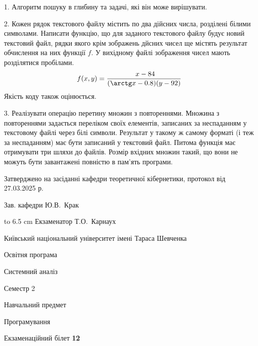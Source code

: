 \documentclass[12pt, ukrainian]{article}
\begin{document}
{%
1. Алгоритм пошуку в глибину та задачі, які він може вирішувати.%
\par
\vspace{2mm}

2. Кожен рядок текстового файлу містить по два дійсних числа, розділені білими символами.
Написати функцію, що для заданого текстового файлу будує новий текстовий файл, рядки якого крім зображень дйсних чисел ще містять результат обчислення на них функції $f$. У вихідному файлі зображення чисел мають розділятися пробілами. 
$$f(x, y) =\frac{\ x - 84}{(\arctg x - 0.8) (y - 92)}$$ 
Якість коду також оцінюється.

\par
\vspace{2mm}

3. Реалізувати операцію перетину множин з повтореннями. Множина з повтореннями задається переліком своїх елементів, записаних за неспаданням у текстовому файлі через білі символи. Результат у такому ж самому форматі (і теж за неспаданням) має бути записаний у текстовий файл. Питома функція має отримувати три шляхи до файлів. Розмір вхідних множин такий, що вони не можуть бути завантажені повністю в пам’ять програми.

}
{\smallskip\smallskip \begin {scriptsize} Затверджено на засіданні кафедри теоретичної кібернетики, протокол   від   27.03.2025 р.\par\smallskip\smallskip\smallskip\smallskip
{\parbox {6.5 cm} {Зав. кафедри \dotfill Ю.В.~Крак}}\hspace {0.7cm} {\hbox to 6.5 cm { Екзаменатор \dotfill Т.О.~Карнаух}} \end{scriptsize}}
\vspace{2.9cm}
{{\begin {scriptsize}\par
{ \center  Київський національний університет імені Тараса Шевченка \par}
{\parbox {5 cm}{Освітня програма \hfill}{\parbox {7 cm}{Системний аналіз\hfill}}\parbox {6 cm}{\hfill Семестр 2}}\par
{\parbox {5 cm} {Навчальний предмет \hfill}\parbox {7 cm}{Програмування \hfill}\parbox {6cm}{\hfill}\par}\vspace{-15pt} \end{scriptsize}}{\center Екзаменаційний білет \No \textbf { 12 }\par}}
\end{document}
